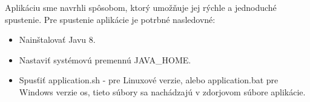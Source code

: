 Aplikáciu sme navrhli spôsobom, ktorý umožňuje jej rýchle a jednoduché spustenie. Pre spustenie aplikácie je potrbné nasledovné: 
\begin{itemize}
	\item Nainštalovať Javu 8.
	\item Nastaviť systémovú premennú JAVA\_HOME.
	\item Spusťiť application.sh - pre Linuxové verzie, alebo application.bat pre Windows verzie \acrshort{os}, tieto súbory sa nachádzajú v zdorjovom súbore aplikácie.
\end{itemize}